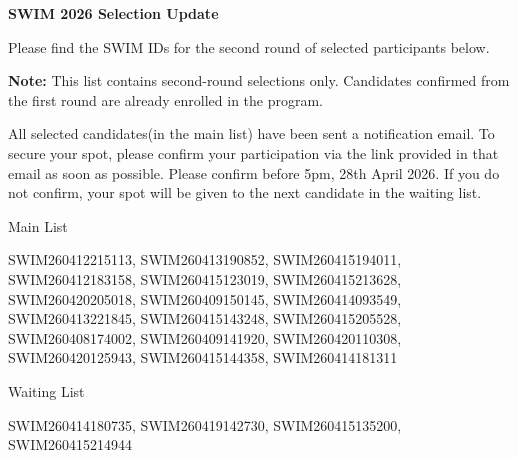 \documentclass[12pt]{letter}
\begin{document}
\textbf{\large SWIM 2026 Selection Update}

Please find the SWIM IDs for the second round of selected participants below.

\textbf{Note:} This list contains second-round selections only. Candidates confirmed from the first round are already enrolled in the program.

All selected candidates(in the main list) have been sent a notification email. To secure your spot, please confirm your participation via the link provided in that email as soon as possible. Please confirm before 5pm, 28th April 2026. If you do not confirm, your spot will be given to the next candidate in the waiting list.
\bigskip

Main List

SWIM260412215113,
SWIM260413190852,
SWIM260415194011,
SWIM260412183158,
SWIM260415123019,
SWIM260415213628,
SWIM260420205018,
SWIM260409150145,
SWIM260414093549,
SWIM260413221845,
SWIM260415143248,
SWIM260415205528,
SWIM260408174002,
SWIM260409141920,
SWIM260420110308,
SWIM260420125943,
SWIM260415144358,
SWIM260414181311

Waiting List

SWIM260414180735,
SWIM260419142730,
SWIM260415135200,
SWIM260415214944
\end{document}
